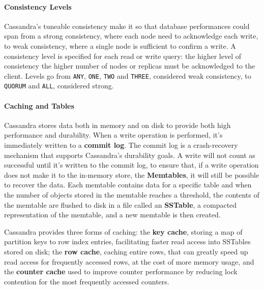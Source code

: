 \paragraph{Consistency Levels} Cassandra's tuneable consistency make it so that database performances could span from a strong consistency, where each node need to acknowledge each write, to weak consistency, where a single node is sufficient to confirm a write. A consistency level is specified for each read or write query: the higher level of consistency the higher number of nodes or replicas must be acknowledged to the client. Levels go from \texttt{ANY}, \texttt{ONE}, \texttt{TWO} and \texttt{THREE}, considered weak consistency, to \texttt{QUORUM} and \texttt{ALL}, considered strong.

\paragraph{Caching and Tables} Cassandra stores data both in memory and on disk to provide both high performance and durability. When a write operation is performed, it’s immediately written to a \textbf{commit log}. The commit log is a crash-recovery mechanism that supports Cassandra’s durability goals. A write will not count as successful until it’s written to the commit log, to ensure that, if a write operation does not make it to the in-memory store, the \textbf{Memtables}, it will still be possible to recover the data. Each memtable contains data for a specific table and when the number of objects stored in the memtable reaches a threshold, the contents of the memtable are flushed to disk in a file called an \textbf{SSTable}, a compacted representation of the memtable, and a new memtable is then created.

Cassandra provides three forms of caching: the \textbf{key cache}, storing a map of partition keys to row index entries, facilitating faster read access into SSTables stored on disk; the \textbf{row cache}, caching entire rows, that can greatly speed up read access for frequently accessed rows, at the cost of more memory usage, and the \textbf{counter cache} used to improve counter performance by reducing lock contention for the most frequently accessed counters.

